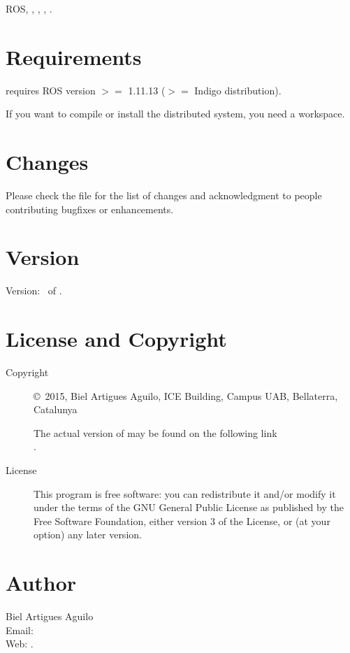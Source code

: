 \documentclass[a4paper,english]{article}
\begin{document}
ROS, , , , .


\section{Requirements}

\begin{description}\setlength{\itemsep}{0cm}
\item[ROS Environment]  requires ROS version $>=$ 1.11.13 ($>=$ Indigo distribution).
\item[ROS Workspace] If you want to compile or install the distributed system, you need a  workspace. 
\end{description}

\section{Changes}
Please check the file  for the list of changes and
acknowledgment to people contributing bugfixes or enhancements.

\section{Version}

Version: \Version\ of \Date.

\section{License and Copyright}

\begin{description}
\item[Copyright] \copyright\ 2015, Biel Artigues Aguilo,
     ICE Building, Campus UAB, Bellaterra, Catalunya\\


     The actual version of   may be found on the following link\\
     .

\item[License] This program is free software: you can redistribute it and/or modify
    it under the terms of the GNU General Public License as published by
    the Free Software Foundation, either version 3 of the License, or
    (at your option) any later version.

\end{description}

\section{Author}

\noindent
Biel Artigues Aguilo                      \\
Email:   \\
Web: .

\LatexManEnd
\end{document}
